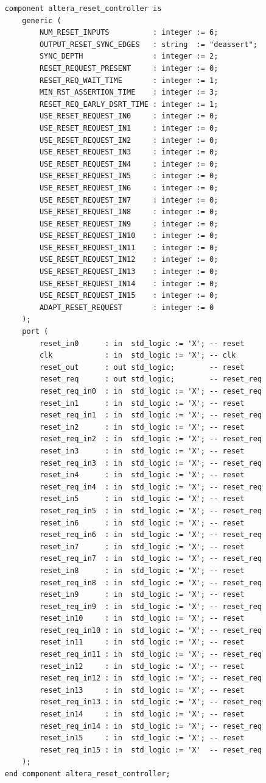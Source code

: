 \documentclass[conference]{IEEEtran}
\begin{document}
\begin{lstlisting}
	component altera_reset_controller is
		generic (
			NUM_RESET_INPUTS          : integer := 6;
			OUTPUT_RESET_SYNC_EDGES   : string  := "deassert";
			SYNC_DEPTH                : integer := 2;
			RESET_REQUEST_PRESENT     : integer := 0;
			RESET_REQ_WAIT_TIME       : integer := 1;
			MIN_RST_ASSERTION_TIME    : integer := 3;
			RESET_REQ_EARLY_DSRT_TIME : integer := 1;
			USE_RESET_REQUEST_IN0     : integer := 0;
			USE_RESET_REQUEST_IN1     : integer := 0;
			USE_RESET_REQUEST_IN2     : integer := 0;
			USE_RESET_REQUEST_IN3     : integer := 0;
			USE_RESET_REQUEST_IN4     : integer := 0;
			USE_RESET_REQUEST_IN5     : integer := 0;
			USE_RESET_REQUEST_IN6     : integer := 0;
			USE_RESET_REQUEST_IN7     : integer := 0;
			USE_RESET_REQUEST_IN8     : integer := 0;
			USE_RESET_REQUEST_IN9     : integer := 0;
			USE_RESET_REQUEST_IN10    : integer := 0;
			USE_RESET_REQUEST_IN11    : integer := 0;
			USE_RESET_REQUEST_IN12    : integer := 0;
			USE_RESET_REQUEST_IN13    : integer := 0;
			USE_RESET_REQUEST_IN14    : integer := 0;
			USE_RESET_REQUEST_IN15    : integer := 0;
			ADAPT_RESET_REQUEST       : integer := 0
		);
		port (
			reset_in0      : in  std_logic := 'X'; -- reset
			clk            : in  std_logic := 'X'; -- clk
			reset_out      : out std_logic;        -- reset
			reset_req      : out std_logic;        -- reset_req
			reset_req_in0  : in  std_logic := 'X'; -- reset_req
			reset_in1      : in  std_logic := 'X'; -- reset
			reset_req_in1  : in  std_logic := 'X'; -- reset_req
			reset_in2      : in  std_logic := 'X'; -- reset
			reset_req_in2  : in  std_logic := 'X'; -- reset_req
			reset_in3      : in  std_logic := 'X'; -- reset
			reset_req_in3  : in  std_logic := 'X'; -- reset_req
			reset_in4      : in  std_logic := 'X'; -- reset
			reset_req_in4  : in  std_logic := 'X'; -- reset_req
			reset_in5      : in  std_logic := 'X'; -- reset
			reset_req_in5  : in  std_logic := 'X'; -- reset_req
			reset_in6      : in  std_logic := 'X'; -- reset
			reset_req_in6  : in  std_logic := 'X'; -- reset_req
			reset_in7      : in  std_logic := 'X'; -- reset
			reset_req_in7  : in  std_logic := 'X'; -- reset_req
			reset_in8      : in  std_logic := 'X'; -- reset
			reset_req_in8  : in  std_logic := 'X'; -- reset_req
			reset_in9      : in  std_logic := 'X'; -- reset
			reset_req_in9  : in  std_logic := 'X'; -- reset_req
			reset_in10     : in  std_logic := 'X'; -- reset
			reset_req_in10 : in  std_logic := 'X'; -- reset_req
			reset_in11     : in  std_logic := 'X'; -- reset
			reset_req_in11 : in  std_logic := 'X'; -- reset_req
			reset_in12     : in  std_logic := 'X'; -- reset
			reset_req_in12 : in  std_logic := 'X'; -- reset_req
			reset_in13     : in  std_logic := 'X'; -- reset
			reset_req_in13 : in  std_logic := 'X'; -- reset_req
			reset_in14     : in  std_logic := 'X'; -- reset
			reset_req_in14 : in  std_logic := 'X'; -- reset_req
			reset_in15     : in  std_logic := 'X'; -- reset
			reset_req_in15 : in  std_logic := 'X'  -- reset_req
		);
	end component altera_reset_controller;


\end{lstlisting}
\end{document}
